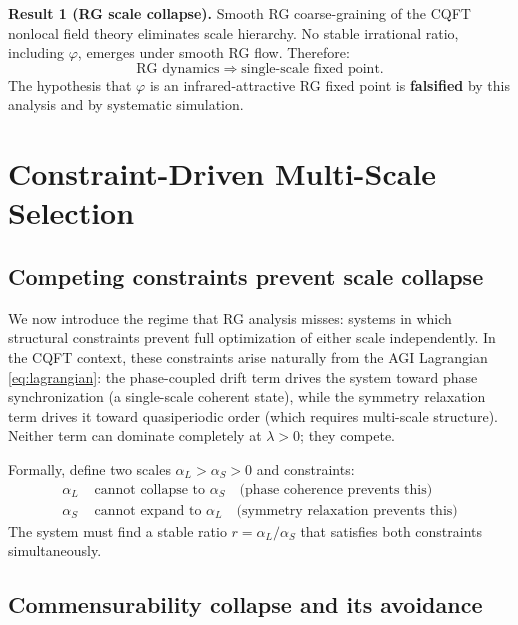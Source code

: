 \documentclass[11pt,a4paper]{article}
\theoremstyle{plain}
\theoremstyle{definition}
\newcommand{\phiGolden}{\varphi}
\begin{document}
\begin{keybox}
\textbf{Result 1 (RG scale collapse).}
Smooth RG coarse-graining of the CQFT nonlocal field theory eliminates
scale hierarchy. No stable irrational ratio, including $\phiGolden$,
emerges under smooth RG flow. Therefore:
\[
\text{RG dynamics} \;\Rightarrow\; \text{single-scale fixed point.}
\]
The hypothesis that $\phiGolden$ is an infrared-attractive RG fixed point
is \textbf{falsified} by this analysis and by systematic simulation.
\end{keybox}

\section{Constraint-Driven Multi-Scale Selection}
\label{sec:constraint}

\subsection{Competing constraints prevent scale collapse}

We now introduce the regime that RG analysis misses: systems in which
structural constraints prevent full optimization of either scale
independently. In the CQFT context, these constraints arise naturally
from the AGI Lagrangian \eqref{eq:lagrangian}: the phase-coupled drift
term drives the system toward phase synchronization (a single-scale
coherent state), while the symmetry relaxation term drives it toward
quasiperiodic order (which requires multi-scale structure). Neither
term can dominate completely at $\lambda > 0$; they compete.

Formally, define two scales $\alpha_L > \alpha_S > 0$ and constraints:
\begin{align}
\alpha_L &\text{ cannot collapse to } \alpha_S
  \quad \text{(phase coherence prevents this)}\label{eq:c1}\\
\alpha_S &\text{ cannot expand to } \alpha_L
  \quad \text{(symmetry relaxation prevents this)}\label{eq:c2}
\end{align}
The system must find a stable ratio $r = \alpha_L / \alpha_S$ that
satisfies both constraints simultaneously.

\subsection{Commensurability collapse and its avoidance}
\end{document}
